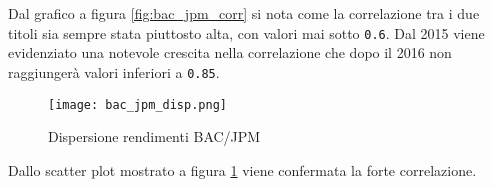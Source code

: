 Dal grafico a figura \ref{fig:bac_jpm_corr} si nota come la correlazione tra i due titoli sia sempre stata piuttosto alta, con valori mai sotto \verb|0.6|.
Dal 2015 viene evidenziato una notevole crescita nella correlazione che dopo il 2016 non raggiungerà valori inferiori a \verb|0.85|.

\begin{figure}[h]
  \centering
  \texttt{[image: bac\_jpm\_disp.png]}
  \caption{Dispersione rendimenti BAC/JPM}
  \label{fig:bac_jpm_disp}
\end{figure}

Dallo scatter plot mostrato a figura \ref{fig:bac_jpm_disp} viene confermata la forte correlazione.

\pagebreak